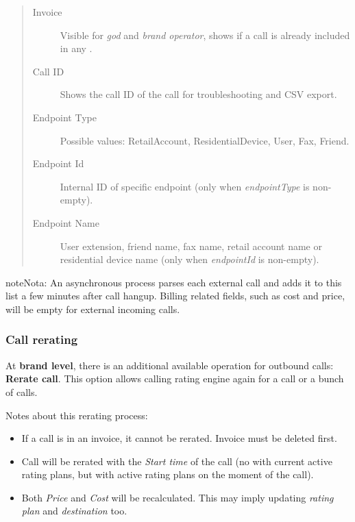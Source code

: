 \documentclass[letterpaper,10pt,spanish]{sphinxmanual}
\begin{document}
\begin{quote}
\begin{description}
\item[{Invoice}] \leavevmode
Visible for \emph{god} and \emph{brand operator}, shows if a call is already included in any {\hyperref[administration_portal/brand/invoicing/invoices:invoices]{}}.

\item[{Call ID}] \leavevmode
Shows the call ID of the call for troubleshooting and CSV export.

\item[{Endpoint Type}] \leavevmode
Possible values: RetailAccount, ResidentialDevice, User, Fax, Friend.

\item[{Endpoint Id}] \leavevmode
Internal ID of specific endpoint (only when \emph{endpointType} is non-empty).

\item[{Endpoint Name}] \leavevmode
User extension, friend name, fax name, retail account name or residential device name (only when \emph{endpointId} is non-empty).

\end{description}
\end{quote}

\begin{notice}{note}{Nota:}
An asynchronous process parses each external call and adds it to this list a few minutes after call hangup. Billing related fields, such as cost and price, will be empty for external incoming calls.
\end{notice}


\subsubsection{Call rerating}
\label{administration_portal/brand/calls/external_calls:call-rerating}
At \textbf{brand level}, there is an additional available operation for outbound calls: \textbf{Rerate call}. This option allows calling rating engine again for a call or a bunch of calls.

Notes about this rerating process:
\begin{itemize}
\item {} 
If a call is in an invoice, it cannot be rerated. Invoice must be deleted first.

\item {} 
Call will be rerated with the \emph{Start time} of the call (no with current active rating plans, but with active rating plans
on the moment of the call).

\item {} 
Both \emph{Price} and \emph{Cost} will be recalculated. This may imply updating \emph{rating plan} and \emph{destination} too.

\end{itemize}
\end{document}

